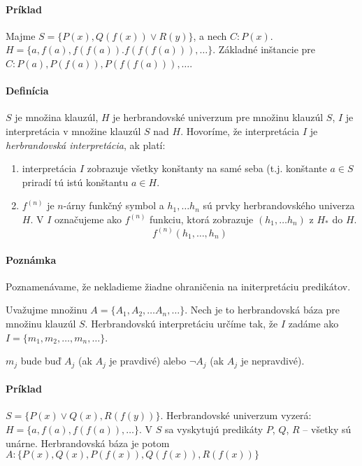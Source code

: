 \paragraph{Príklad} Majme $S = \{P(x), Q(f(x)) \lor R(y) \}$, a nech
$C: P(x)$. $H = \{ a, f(a), f(f(a)). f(f(f(a))), \ldots \}$. Základné inštancie
pre $C: P(a), P(f(a)), P(f(f(a))), \ldots$.

\paragraph{Definícia} $S$ je množina klauzúl, $H$ je herbrandovské
univerzum pre množinu klauzúl $S$, $I$ je interpretácia v množine
klauzúl $S$ nad $H$. Hovoríme, že interpretácia $I$ je \emph{herbrandovská
interpretácia}, ak platí: 

\begin{enumerate}
	\item interpretácia $I$ zobrazuje všetky konštanty na samé seba (t.j.
	konštante $a \in S$ priradí tú istú konštantu $a \in H$.
	\item $f^{(n)}$ je $n$-árny funkčný symbol a $h_1, \ldots h_n$ sú prvky
	herbrandovského univerza $H$. V $I$ označujeme ako $f^{(n)}$ funkciu,
	ktorá zobrazuje $(h_1, \ldots h_n)$ z $H_*$ do $H$. $$f^{(n)}(h_1,
	\ldots, h_n)$$
\end{enumerate}

\paragraph{Poznámka} Poznamenávame, že nekladieme žiadne ohraničenia na initerpretáciu predikátov.

Uvažujme množinu $A = \{ A_1, A_2, \ldots A_n, \ldots \}$. Nech je to
herbrandovská báza pre množinu klauzúl $S$. Herbrandovskú interpretáciu určíme
tak, že  $I$ zadáme ako $I=\{ m_1, m_2, \ldots, m_n, \ldots \}$. 

\par $m_j$ bude buď $A_j$ (ak $A_j$ je pravdivé) alebo $\neg A_j$ (ak $A_j$ je
nepravdivé).

\paragraph{Príklad} $S=\{ P(x) \lor Q(x), R(f(y)) \}$. Herbrandovské univerzum
vyzerá: $H=\{a, f(a), f(f(a)), \ldots \}$. V $S$ sa vyskytujú predikáty $P$,
$Q$, $R$ --  všetky sú unárne. Herbrandovská báza je potom $A: \{ P(x), Q(x),
 P(f(x)), Q(f(x)), R(f(x)) \}$
 
